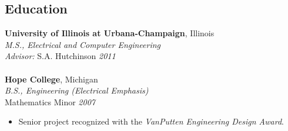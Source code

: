 \documentclass{article}
\begin{document}
{\setlength{\columnsep}{35px}

\begin{multicols}{2}

%
%
\section*{Education}
\noindent \textbf{University of Illinois at Urbana-Champaign}, Illinois\\
\textsl{M.S., Electrical and Computer Engineering}\\
\textsl{Advisor:} S.A. Hutchinson \hfill \textsl{2011}\\\vspace{0px}\\
\noindent \textbf{Hope College}, Michigan\\
\textsl{B.S., Engineering (Electrical Emphasis)}\\
Mathematics Minor \hfill \textsl{2007}\\
    \vspace{ -10px}
    \begin{itemize}[noitemsep,nolistsep]
        \item Senior project recognized with the \textit{VanPutten Engineering Design Award}.
    \end{itemize}
    \vspace{5px}

\end{multicols}}
\end{document}
